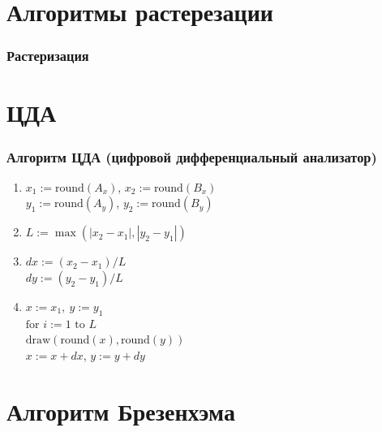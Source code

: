 \documentclass[10pt]{beamer}
\begin{document}
	
	\section[Растерезация]{Алгоритмы растерезации}
	\frame{\sectionpage}
	
	
	\begin{frame}\frametitle{Растеризация}
		
		
	\end{frame}
		
	\section{ЦДА}
	
	
	

	\frame{\sectionpage}
	
	
	\begin{frame}\frametitle{Алгоритм ЦДА (цифровой дифференциальный анализатор)}
		{
		}
		{
			\small
			\begin{enumerate}
				\item<+-> $x_1:=\text{round}(A_x)$, $x_2:=\text{round}(B_x)$\\				
					  $y_1:=\text{round}(A_y)$, $y_2:=\text{round}(B_y)$\\
					  
					  
				\item<+-> $L:=\max(|x_2-x_1|,|y_2-y_1|)$
				
				\item<+-> $dx:=(x_2-x_1)/L$\\
				      $dy:=(y_2-y_1)/L$
				      
				\item <+->	$x:=x_1,\ y:=y_1$\\						
						$\text{for }i:=1 \text{ to } L$\\
						\quad $\text{draw}(\text{round}(x),\text{round}(y))$\\
						\quad $x:=x+dx$, $y:=y+dy$ \\
						
			\end{enumerate}
		}
	\end{frame}
	
	\section[Хайзенберг]{Алгоритм Брезенхэма}
	\frame{\sectionpage}
	
\end{document}
